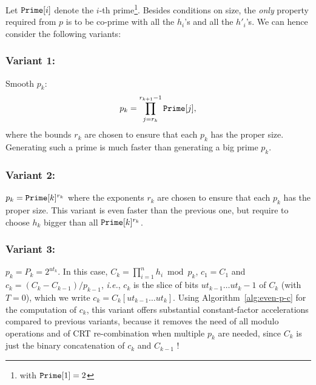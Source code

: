 \documentclass[11pt]{llncs}
\begin{document}
Let $\mbox{{\tt Prime}}[i]$ denote the $i$-th prime\footnote{with $\mbox{{\tt Prime}}[1]=2$}. Besides conditions on size, the \textit{only} property required from $p$ is to be co-prime with all the $h_i$'s and all the $h'_i$'s. We can hence consider the following variants:
\subsubsection{Variant 1:} Smooth $p_k$:
\[ p_k=\prod_{j=r_k}^{r_{k+1}-1} \mbox{{\tt Prime}}[j], \]
where the bounds $r_k$ are chosen to ensure that each $p_k$ has the proper size.
Generating such a prime is much faster than generating a big prime $p_k$.

\subsubsection{Variant 2:} $p_k=\mbox{{\tt Prime}}[k]^{r_k}$ where the exponents $r_k$ are chosen to ensure that each $p_k$ has the proper size.
This variant is even faster than the previous one, but require to choose $h_k$ bigger than all
$\mbox{{\tt Prime}}[k]^{r_k}$. 

\subsubsection{Variant 3:} $p_k = P_k = 2^{ut_k}$. 
In this case, $C_k = \prod_{i=1}^n h_i \bmod p_k$, $c_1 = C_1$ and $c_k = (C_k - C_{k-1}) / p_{k-1}$, {\it i.e.}, $c_k$ is the slice of bits $ut_{k-1}\dots ut_k-1$ of $C_k$ (with $T = 0$), which we write $c_k = C_k[ut_{k-1}\dots ut_k]$.
Using Algorithm~\ref{alg:even-p-c} for the computation of $c_k$, this variant offers substantial constant-factor accelerations compared to previous variants, because it removes the need of all modulo operations and of CRT re-combination when multiple $p_k$ are needed, since $C_k$ is just the binary concatenation of $c_k$ and $C_{k-1}$ !
\end{document}
